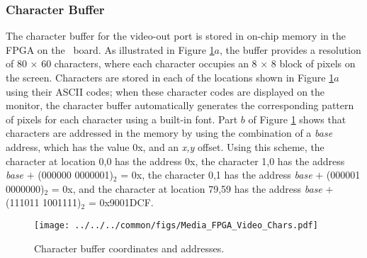 \subsubsection{Character Buffer}

The character buffer for the video-out port is stored in on-chip memory in the FPGA
on the \DEBoard~board. As illustrated in Figure \ref{fig:chars}$a$, the buffer provides 
a resolution of 80 $\times$ 60 characters, where each character occupies an 8 $\times$ 8
block of pixels on the screen. Characters are stored in each of the locations shown in
Figure \ref{fig:chars}$a$ using their ASCII codes; when these character codes are 
displayed on the monitor, the character buffer automatically generates the
corresponding pattern of pixels for each character using a built-in font. 
Part $b$ of Figure \ref{fig:chars} shows that characters are addressed in the memory by 
using the combination of a {\it base} address, which has the value 
{\sf 0x}, and an {\it x,y}
offset. Using this scheme, the character at location 0,0 has the address
{\sf 0x}, 
the character 1,0 has the address {\it base} $+$ (000000 0000001)$_2$ = {\sf 0x}, 
the character 0,1 has the address {\it base} $+$ (000001 0000000)$_2$ = {\sf 0x}, and 
the character at location 79,59 has the address {\it base} $+$ (111011 1001111)$_2$ = 
{\sf 0x\baseAddressOffset 9001DCF}. 

\begin{figure}[h!]
   \begin{center}
       \texttt{[image: ../../../common/figs/Media\_FPGA\_Video\_Chars.pdf]}
   \end{center}
   \caption{Character buffer coordinates and addresses.}
	\label{fig:chars}
\end{figure}
